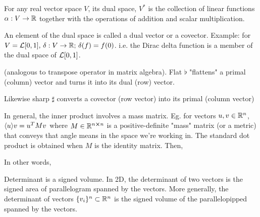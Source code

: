 \begin{definition}
    For any real vector space $V$, its dual space, $V^*$ is the collection of linear functions $\alpha:V\rightarrow \mathbb{R}$ together with the operations of addition and scalar multiplication.
\end{definition}

An element of the dual space is called a dual vector or a covector. Example: for $V = \mathcal{L}[0,1],\, \delta:V\rightarrow\mathbb{R};\, \delta(f)=f(0)$. i.e. the Dirac delta function is a member of the dual space of $\mathcal{L}[0,1]$.

\begin{definition}
    (analogous to transpose operator in matrix algebra). Flat $\flat$ "flattens" a primal (column) vector and turns it into its dual (row) vector.
    
    
    Likewise sharp $\sharp$ converts a covector (row vector) into its primal (column vector)
    \eqn{
        \alpha,\beta \rightarrow^\sharp \alpha(\beta^\sharp)
    }
\end{definition}

In general, the inner product involves a mass matrix. Eg. for vectors $u,v \in \mathbb{R}^n$, $\langle u \rangle{v}= u^T M v$ where $M\in \mathbb{R}^{n\cross n}$ is a positive-definite "mass" matrix (or a metric) that conveys that angle means in the space we're working in. The standard dot product is obtained when $M$ is the identity matrix. Then,

In other words,

\begin{definition}
    Determinant is a signed volume. In 2D, the determinant of two vectors is the signed area of parallelogram spanned by the vectors. More generally, the determinant of vectors $\{v_i\}^n\subset\mathbb{R}^n$ is the signed volume of the parallelopipped spanned by the vectors.
\end{definition}


